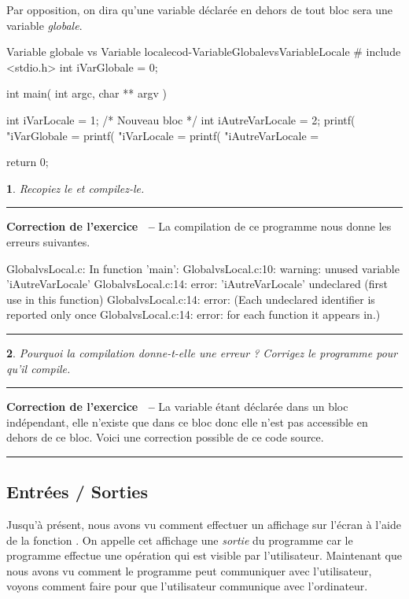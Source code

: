 \documentclass[a4paper]{article}
\newenvironment{Correction}{\par\tiny\blue\rule[1ex]{\textwidth}{1pt}\par\normalsize\textbf{\sffamily{}Correction de l'exercice~\theExo{} -- }}{\par\tiny\blue\rule[1ex]{\textwidth}{1pt}\par}
\newtheorem{Exo}{{\sffamily{Exercice}}}
\begin{document}
{			Par opposition, on dira qu'une variable déclarée en dehors de tout bloc sera une variable \emph{globale}.
			\begin{Code}{Variable globale vs Variable locale}{cod-VariableGlobalevsVariableLocale}
# include <stdio.h>
int iVarGlobale = 0;

int main( int argc, char ** argv )
{
	int iVarLocale = 1;
	/* Nouveau bloc */
	{
		int iAutreVarLocale = 2;
	}
	printf( "iVarGlobale = %
	printf( "iVarLocale = %
	printf( "iAutreVarLocale = %

	return 0;
}
			\end{Code}
			\begin{Exo}
				Recopiez le  et compilez-le.
			\end{Exo}
			\begin{Correction}
				La compilation de ce programme nous donne les erreurs suivantes.
				\begin{Code*}
GlobalvsLocal.c: In function 'main':
GlobalvsLocal.c:10: warning: unused variable 'iAutreVarLocale'
GlobalvsLocal.c:14: error: 'iAutreVarLocale' undeclared (first use in this function)
GlobalvsLocal.c:14: error: (Each undeclared identifier is reported only once
GlobalvsLocal.c:14: error: for each function it appears in.)
				\end{Code*}
			\end{Correction}
			\begin{Exo}
				Pourquoi la compilation donne-t-elle une erreur ? Corrigez le programme pour qu'il compile.
			\end{Exo}
			\begin{Correction}
				La variable  étant déclarée dans un bloc indépendant, elle n'existe que dans ce bloc donc elle n'est pas accessible en dehors de ce bloc.
				Voici une correction possible de ce code source.
			\end{Correction}

		\subsection{Entrées / Sorties}
			Jusqu'à présent, nous avons vu comment effectuer un affichage sur l'écran à l'aide de la fonction .
			On appelle cet affichage une \emph{sortie} du programme car le programme effectue une opération qui est visible par l'utilisateur.
			Maintenant que nous avons vu comment le programme peut communiquer avec l'utilisateur, voyons comment faire pour que l'utilisateur communique avec l'ordinateur.

}
\end{document}
